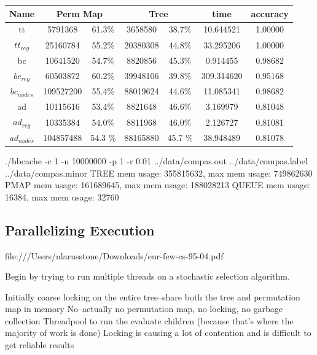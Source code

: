 \documentclass[]{article}
\theoremstyle{definition}
\begin{document}
\begin{center}
\begin{tabular} { |c|c|c|c|c|c|c| }
\hline
Name & \multicolumn{2}{c|}{Perm Map} & \multicolumn{2}{c|}{Tree} & time & accuracy \\
\hline

tt & 5791368 & 61.3\%  & 3658580 & 38.7\% & 10.644521 & 1.00000 \\

$tt_{reg}$ & 25160784 & 55.2\% & 20380308 & 44.8\% & 33.295206 & 1.00000 \\

bc & 10641520 & 54.7\% &8820856 & 45.3\% & 0.914455 & 0.98682 \\

$bc_{reg}$ & 60503872 & 60.2\% & 39948106 & 39.8\% & 309.314620 & 0.95168 \\

$bc_{nodes}$ & 109527200 & 55.4\% & 88019624 & 44.6\% & 11.085341 & 0.98682 \\

ad & 10115616 & 53.4\% & 8821648 & 46.6\% & 3.169979 & 0.81048 \\

$ad_{reg}$ & 10335384 & 54.0\% & 8811968 & 46.0\% & 2.126727 & 0.81081 \\

$ad_{nodes}$ & 104857488 & 54.3 \% & 88165880 & 45.7 \% & 38.948489 &  0.81078\\
\hline
\end{tabular}
\end{center}

 ./bbcache -c 1 -n 10000000 -p 1 -r 0.01 ../data/compas.out ../data/compas.label ../data/compas.minor
TREE mem usage: 355815632, max mem usage: 749862630
PMAP mem usage: 161689645, max mem usage: 188028213
QUEUE mem usage: 16384, max mem usage: 32760

\subsection{Parallelizing Execution}

file:///Users/nlarusstone/Downloads/eur-few-cs-95-04.pdf

Begin by trying to run multiple threads on a stochastic selection algorithm.

Initially coarse locking on the entire tree--share both the tree and permutation map in memory
No--actually no permutation map, no locking, no garbage collection
	Threadpool to run the evaluate children (because that's where the majority of work is done)
	Locking is causing a lot of contention and is difficult to get reliable results
\end{document}
